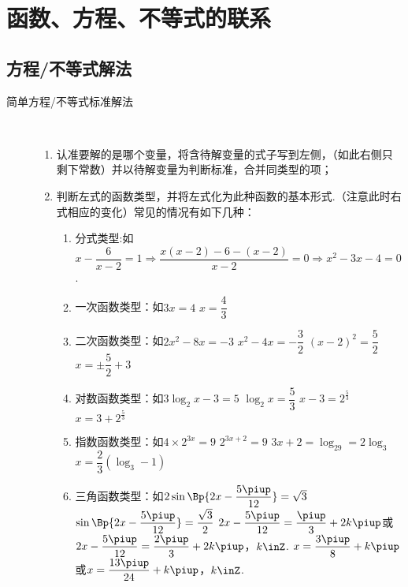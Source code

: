 \section{函数、方程、不等式的联系}
  \subsection{方程/不等式解法}
    \begin{description}
      \item[简单方程/不等式标准解法]\hspace{0.5em}\\\vspace{-2.5em}\begin{enumerate}[label=\arabic*)]
        \item 认准要解的是哪个变量，将含待解变量的式子写到左侧，（如此右侧只剩下常数）并以待解变量为判断标准，合并同类型的项；
        \item 判断左式的函数类型，并将左式化为此种函数的基本形式.（注意此时右式相应的变化）常见的情况有如下几种：
              \begin{enumerate}[label=\circled{\arabic*}]
                \item 分式类型:如$x-\dfrac6{x-2}=1 \Rightarrow \dfrac{x(x-2)-6-(x-2)}{x-2}=0 \Rightarrow x^2-3x-4=0$.
                \item 一次函数类型：如$3x=4$ \Rightarrow $x=\dfrac43$
                \item 二次函数类型：如$2x^2-8x=-3$ \Rightarrow $x^2-4x=-\dfrac32$
                  \Rightarrow $(x-2)^2=\dfrac52$ \Rightarrow $x=\pm\dfrac52+3$
                \item 对数函数类型：如$3\log_2{x-3}=5$ \Rightarrow $\log_2x=\dfrac53$
                  \Rightarrow $x-3=2^{\frac53}$ \Rightarrow $x=3+2^{\frac53}$
                \item 指数函数类型：如$4\times 2^{3x}=9$ \Rightarrow $2^{3x+2}=9$
                  \Rightarrow $3x+2=\log_29=2\log_3$ \Rightarrow $x=\dfrac23(\log_3-1)$
                \item 三角函数类型：如$2\sin\Bp{2x-\dfrac{5\piup}{12}}=\sqrt3$
                  \Rightarrow $\sin\Bp{2x-\dfrac{5\piup}{12}}=\dfrac{\sqrt3}2$
                  \Rightarrow $2x-\dfrac{5\piup}{12}=\dfrac{\piup}3+2k\piup$或
                   $2x-\dfrac{5\piup}{12}=\dfrac{2\piup}3+2k\piup$，$k\inZ$.
                  \Rightarrow $x=\dfrac{3\piup}8+k\piup$或$x=\dfrac{13\piup}{24}+k\piup$，$k\inZ$.
              \end{enumerate}
      \end{enumerate}
    \end{description}
